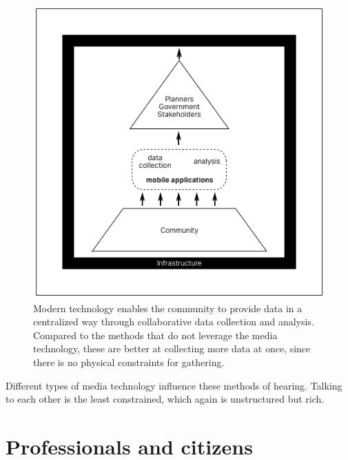 \begin{figure}[htb]
  \includegraphics[width=\textwidth]{chapters/2/fig/unstructured_app.png}               
  \caption[diagram: unstructured app]{
    Modern technology enables the community to provide data in a centralized way through collaborative data
    collection and analysis. Compared to the methods that do not leverage the
    media technology, these are better at collecting more data at once, since
  there is no physical constraints for gathering.}
  \label{fig:unstructured_app}
\end{figure}

Different types of media technology influence these methods of hearing. Talking to each other is the least constrained, which again is unstructured but rich.

\section{Professionals and citizens}

